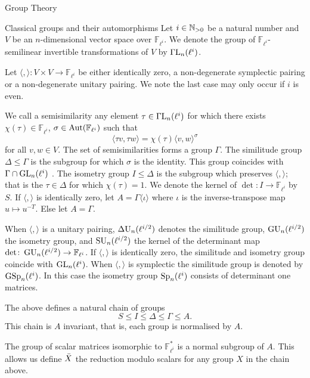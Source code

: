 \documentclass[11pt,a4paper]{article}
\newcommand{\Fli}{\mathbb{F}_{\ell^i}}
\newcommand{\lihalf}{{\ell^{i/2}}}
\begin{document}
\begin{section}{Group Theory}
\label{section_group_theory}
\begin{subsection}{Classical groups and their automorphisms}
\label{subsection_classical_groups_and_their_automorphisms}
Let $i \in \mathbb{N}_{>0}$ be a natural number and $V$ be an $n$-dimensional vector space over $\Fli$. 
We denote the group of $\Fli$-semilinear invertible transformations of $V$ by $\GammaL_n(\ell^i)$. 

Let $\langle , \rangle \colon V \times V \rightarrow \Fli$ be either identically zero, a non-degenerate symplectic pairing or a non-degenerate unitary pairing.
We note the last case may only occur if $i$ is even.

We call a semisimilarity any element $\tau \in \GammaL_n(\ell^i)$ for which there exists $\chi(\tau) \in \Fli$, $\sigma \in \Aut(\Fli)$ such that
\[\langle \tau v, \tau w \rangle = \chi(\tau) \langle  v,  w \rangle^\sigma\]
for all $v,w \in V$.
The set of semisimilarities forms a group $\Gamma$.
The similitude group $\Delta \leq \Gamma$ is the subgroup for which $\sigma$ is the identity. This group coincides with $\Gamma \cap \GL_n(\ell^i)$ \cite[Lemma 2.1.2 (iv)]{KleidmanLiebeck}.
The isometry group $I \leq \Delta$ is the subgroup which preserves $\langle, \rangle$; that is the $\tau \in \Delta$ for which $\chi(\tau)=1$.
We denote the kernel of $\det\colon I \rightarrow \Fli$ by $S$.
If $\langle, \rangle$ is identically zero, let $A=\Gamma\langle \iota \rangle$ where $\iota$ is the inverse-transpose map $u \mapsto u^{-T}$. Else let $A=\Gamma$.

When $\langle, \rangle$ is a unitary pairing, $\DU_n(\lihalf)$ denotes the similitude group,
$\GU_n(\lihalf)$ the isometry group,
and $\SU_n(\lihalf)$ the kernel of the determinant map $\det \colon \GU_n(\lihalf) \rightarrow \Fli$. If $\langle, \rangle$ is identically zero, the similitude and isometry group coincide with $\GL_n(\ell^i)$.
When $\langle, \rangle$ is symplectic the similitude group is denoted by $\GSp_n(\ell^i)$. In this case the isometry group $\Sp_n(\ell^i)$ consists of determinant one matrices.

The above defines a natural chain of groups
\[S \leq I \leq \Delta \leq \Gamma \leq A.\]
This chain is $A$ invariant, that is, each group is normalised by $A$.

The group of scalar matrices isomorphic to $\Fli^*$ is a normal subgroup of $A$.
This allows us define $\Bar{X}$ the reduction modulo scalars for any group $X$ in the chain above.


\end{subsection}
\end{section}
\end{document}
